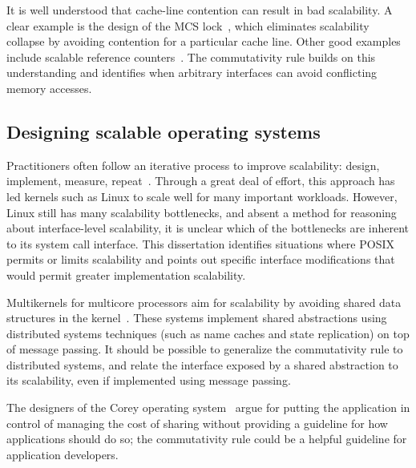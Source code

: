
It is well understood that cache-line
contention can result in bad scalability. A clear example is the design of
the MCS lock~\cite{MCS}, which eliminates scalability collapse by avoiding
contention for a particular cache line.  Other good examples include
scalable reference counters~\cite{approx:counter,snzi:podc}.
%
The commutativity rule builds on this understanding and identifies when
arbitrary interfaces can avoid conflicting memory accesses.

\subsection{Designing scalable operating systems}

Practitioners often follow an iterative process to
improve scalability: design, implement, measure, 
repeat~\cite{cacm-real-world}.
%
Through a great deal of effort,
this approach has led kernels such as Linux to scale well
for many important workloads. However, Linux still has many
scalability bottlenecks, and absent a method for reasoning about
interface-level scalability, it is unclear which of the bottlenecks
are inherent to its system call interface.  This dissertation
identifies situations
where POSIX permits or limits scalability and points out specific interface
modifications that would permit greater implementation scalability.

Multikernels for multicore processors aim for scalability by avoiding shared
data structures in the kernel~\cite{barrelfish:sosp,wentzlaff:fos}.  These
systems implement shared abstractions using distributed systems techniques (such
as name caches and state replication) on top of message passing.  It should be
possible to generalize the commutativity rule to distributed systems, and relate
the interface exposed by a shared abstraction to its scalability, even if
implemented using message passing.

The designers of the Corey operating system~\cite{boyd-wickizer:corey} argue for
putting the application in control of managing the cost of sharing without
providing a guideline for how applications should do so;
the commutativity rule could be a helpful guideline
for application developers.

